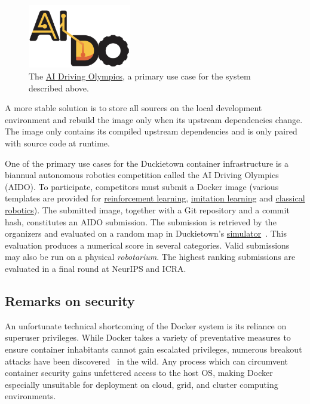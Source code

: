 \documentclass[12pt,initial,twoside,maitrise]{dms}
\numberwithin{equation}{section}
\numberwithin{table}{chapter}
\numberwithin{figure}{chapter}
\begin{document}
\begin{figure}
    \includegraphics[width=0.40\textwidth]{../figures/aido_logo.png}
    \caption{The \href{https://www.duckietown.org/research/ai-driving-olympics}{AI Driving Olympics}, a primary use case for the system described above.}
    \label{fig:aido_logo}
\end{figure}

A more stable solution is to store all sources on the local development environment and rebuild the image only when its upstream dependencies change. The image only contains its compiled upstream dependencies and is only paired with source code at runtime.

One of the primary use cases for the Duckietown container infrastructure is a biannual autonomous robotics competition called the AI Driving Olympics~\citep{aido2018} (AIDO). To participate, competitors must submit a Docker image (various templates are provided for \href{https://github.com/duckietown/challenge-aido_LF-baseline-RL-sim-pytorch}{reinforcement learning}, \href{https://github.com/duckietown/challenge-aido_LF-baseline-IL-logs-tensorflow}{imitation learning} and \href{https://github.com/duckietown/challenge-aido_LF-template-ros}{classical robotics}). The submitted image, together with a Git repository and a commit hash, constitutes an AIDO submission. The submission is retrieved by the organizers and evaluated on a random map in Duckietown's \href{https://github.com/duckietown/gym-duckietown}{simulator}~\citep{gym_duckietown}. This evaluation produces a numerical score in several categories. Valid submissions may also be run on a physical \textit{robotarium}. The highest ranking submissions are evaluated in a final round at NeurIPS and ICRA.

\subsection{Remarks on security}

An unfortunate technical shortcoming of the Docker system is its reliance on superuser privileges. While Docker takes a variety of preventative measures to ensure container inhabitants cannot gain escalated privileges, numerous breakout attacks have been discovered~\citep{martin2018docker} in the wild. Any process which can circumvent container security gains unfettered access to the host OS, making Docker especially unsuitable for deployment on cloud, grid, and cluster computing environments.
\end{document}
